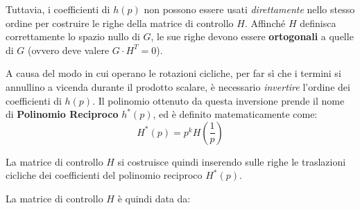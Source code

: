 Tuttavia, i coefficienti di $h(p)$ non possono essere usati \textit{direttamente} nello stesso ordine per costruire le righe della matrice di controllo $H$. Affinché $H$ definisca correttamente lo spazio nullo di $G$, le sue righe devono essere \textbf{ortogonali} a quelle di $G$ (ovvero deve valere $G \cdot H^T = 0$).

A causa del modo in cui operano le rotazioni cicliche, per far sì che i termini si annullino a vicenda durante il prodotto scalare, è necessario \textit{invertire} l'ordine dei coefficienti di $h(p)$. Il polinomio ottenuto da questa inversione prende il nome di \textbf{Polinomio Reciproco} $h^*(p)$, ed è definito matematicamente come:
$$H^*(p)= p^k H \left(\frac{1}{p}\right)$$

La matrice di controllo $H$ si costruisce quindi inserendo sulle righe le traslazioni cicliche dei coefficienti del polinomio reciproco $H^*(p)$.

La matrice di controllo $H$ è quindi data da:



